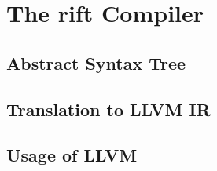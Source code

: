 \chapter{The rift Compiler}
\section{Abstract Syntax Tree}
\section{Translation to LLVM IR}
\section{Usage of LLVM}
